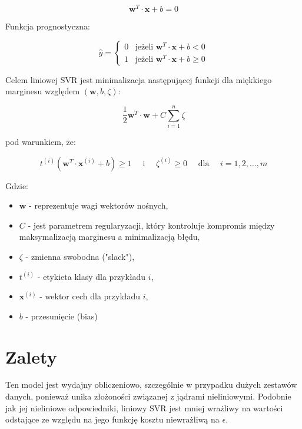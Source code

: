 $$
\boldsymbol{w}^T \cdot \boldsymbol{x} + b = 0
$$

Funkcja prognostyczna:

$$
\hat{y} ={ \begin{cases}
    0 & \text{jeżeli } \boldsymbol{w}^T \cdot \boldsymbol{x} + b \lt 0 \\
    1 & \text{jeżeli } \boldsymbol{w}^T \cdot \boldsymbol{x} + b \geq 0
\end{cases}}
$$


Celem liniowej SVR jest minimalizacja następującej funkcji dla miękkiego marginesu względem $( \boldsymbol{w},b,\zeta)$:

$$
\frac{1}{2} \boldsymbol{w}^T \cdot \boldsymbol{w} + C \sum_{i=1}^{n} \zeta
$$

pod warunkiem, że:

$$
t^{(i)}(\boldsymbol{w}^T \cdot \boldsymbol{x}^{(i)} + b) \geq 1 \quad \text{ i } \quad \zeta^{(i)} \geq 0 \quad \text{ dla } \quad i=1,2,\dots,m
$$

Gdzie:
\begin{itemize}
\setlength\itemsep{-0.5em}
 \item  $\boldsymbol{w}$ - reprezentuje wagi wektorów nośnych,

\item $C$ - jest parametrem regularyzacji, który kontroluje kompromis między maksymalizacją marginesu a minimalizacją błędu,

 \item  $\zeta$ - zmienna swobodna ("slack"),

 \item  $t^{(i)}$ - etykieta klasy dla przykładu $i$,

 \item  $\boldsymbol{x}^{(i)}$ - wektor cech dla przykładu $i$,

\item $b$ - przesunięcie (bias)
\end{itemize}


{}
\section*{Zalety }
\vspace{-1.0em}

\hspace{1.5cm} Ten model jest wydajny obliczeniowo, szczególnie w przypadku dużych zestawów danych, ponieważ unika złożoności związanej z jądrami nieliniowymi.
Podobnie jak jej nieliniowe odpowiedniki, liniowy SVR jest mniej wrażliwy na wartości odstające ze względu na jego funkcję kosztu niewrażliwą na $\epsilon$.


